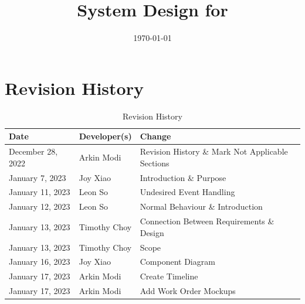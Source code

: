 \documentclass[12pt, titlepage]{article}
\begin{document}
\title{System Design for \progname{}}
\author{\authname}
\date{\today}

\maketitle


\section{Revision History}

\begin{table}[hp]
	\caption{Revision History} \label{TblRevisionHistory}
	\begin{tabularx}{\textwidth}{llX}
		\toprule
		\textbf{Date}     & \textbf{Developer(s)} & \textbf{Change}                                                                                   \\
		\midrule
		December 28, 2022 & Arkin Modi            & Revision History \& Mark Not Applicable Sections                                                  \\
		January 7, 2023   & Joy Xiao              & Introduction \& Purpose                                                                           \\
		January 11, 2023  & Leon So               & Undesired Event Handling                                                                          \\
		January 12, 2023  & Leon So               & Normal Behaviour \& Introduction                                                                  \\
		January 13, 2023  & Timothy Choy          & Connection Between Requirements \& Design                                                         \\
		January 13, 2023  & Timothy Choy          & Scope                                                                                             \\
		January 16, 2023  & Joy Xiao              & Component Diagram                                                                                 \\
		January 17, 2023  & Arkin Modi            & Create Timeline                                                                                   \\
		January 17, 2023  & Arkin Modi            & Add Work Order Mockups                                                                            \\

\end{tabularx}
\end{table}
\end{document}
